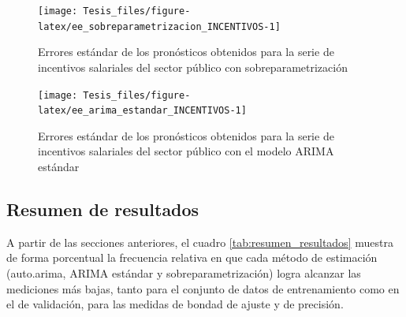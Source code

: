 \documentclass[
]{article}
\begin{document}
\begin{figure}[H]
\texttt{[image: Tesis\_files/figure-latex/ee\_sobreparametrizacion\_INCENTIVOS-1]} \caption{Errores estándar de los pronósticos obtenidos para la serie de incentivos salariales del sector público con sobreparametrización}\label{fig:ee_sobreparametrizacion_INCENTIVOS}
\end{figure}

\begin{figure}[H]
\texttt{[image: Tesis\_files/figure-latex/ee\_arima\_estandar\_INCENTIVOS-1]} \caption{Errores estándar de los pronósticos obtenidos para la serie de incentivos salariales del sector público con el modelo ARIMA estándar}\label{fig:ee_arima_estandar_INCENTIVOS}
\end{figure}

\subsection{Resumen de resultados}

A partir de las secciones anteriores, el cuadro
\ref{tab:resumen_resultados} muestra de forma porcentual la frecuencia
relativa en que cada método de estimación (auto.arima, ARIMA estándar y
sobreparametrización) logra alcanzar las mediciones más bajas, tanto
para el conjunto de datos de entrenamiento como en el de validación,
para las medidas de bondad de ajuste y de precisión.

\begin{table}[H]

\caption{\label{tab:unnamed-chunk-37}\label{tab:resumen_resultados}Distribución porcentual de los métodos de estimación que alcanzaron los mejores resultados según conjunto de datos y tipo de medición}
\centering
{}
\end{table}
\end{document}
